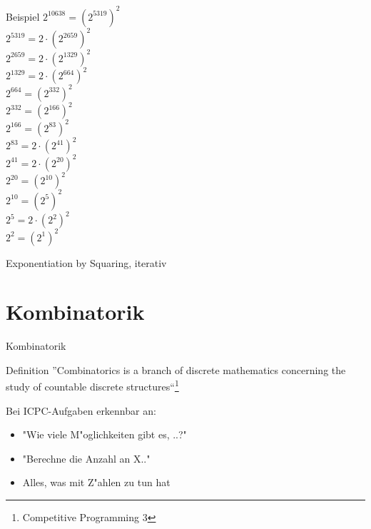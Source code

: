 \documentclass[18pt]{beamer}
\begin{document}
\begin{frame} {Beispiel}
$2^ {10638} = (2^{5319})^{2}  $ \\
$2^ {5319} = 2 \cdot (2^{2659})^{2}  $ \\
$2^ {2659} = 2 \cdot (2^{1329})^{2}  $ \\
$2^ {1329} = 2 \cdot (2^{664})^{2}  $ \\
$2^ {664} = (2^{332})^{2}  $ \\
$2^ {332} = (2^{166})^{2}  $ \\
$2^ {166} = (2^{83})^{2}  $ \\
$2^ {83} = 2 \cdot (2^{41})^{2}  $ \\
$2^ {41} = 2 \cdot (2^{20})^{2}  $ \\
$2^ {20} = (2^{10})^{2}  $ \\
$2^ {10} = (2^{5})^{2}  $ \\
$2^ {5} = 2 \cdot (2^{2})^{2}  $ \\
$2^ {2} = (2^{1})^{2}  $ \\
\end{frame}

\begin{frame} {Exponentiation by Squaring, iterativ}
\end{frame}




\section{Kombinatorik}


\begin{frame}{Kombinatorik}
\begin{block}{Definition}
	''Combinatorics is a branch of discrete mathematics concerning the study of countable discrete structures``\footnote{Competitive Programming 3}
\end{block}

Bei ICPC-Aufgaben erkennbar an:
\begin{itemize}
	\item "Wie viele M"oglichkeiten gibt es, ..?"
	\item "Berechne die Anzahl an X.."
	\item Alles, was mit Z"ahlen zu tun hat
\end{itemize}
\end{frame}
\end{document}

